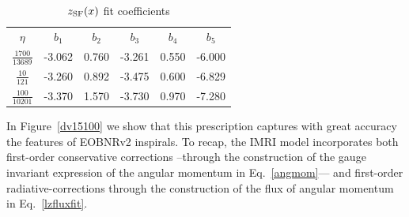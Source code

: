 \begin{table}[ht]
\centering
\begin{tabular}{c c c c c c}
\hline\hline
  $\eta$& $b_1$ & $b_2$ & $b_3$ & $b_4$ & $ b_5 $  \\  
    $\frac{1700}{13689}$& -3.062 & 0.760 & -3.261 & 0.550 & -6.000 \\ [1ex]
   $\frac{10}{121}$& -3.260 & 0.892 & -3.475 & 0.600 & -6.829\\ [1ex]
    $\frac{100}{10201}$&-3.370 & 1.570 & -3.730 & 0.970 & -7.280 \\ [1ex]
\hline
\end{tabular}
\caption{\(z_{\rm SF} (x)\) fit coefficients}
\label{zedfunccoef}
\end{table}

In Figure~\ref{dv15100} we show that this prescription captures with great accuracy the features of EOBNRv2  inspirals. To recap,  the IMRI model incorporates both first-order conservative corrections --through  the construction of the gauge invariant expression of the angular momentum in  Eq.~\eqref{angmom}--- and first-order radiative-corrections through the construction of the flux of angular momentum in Eq.~\eqref{lzfluxfit}. 

